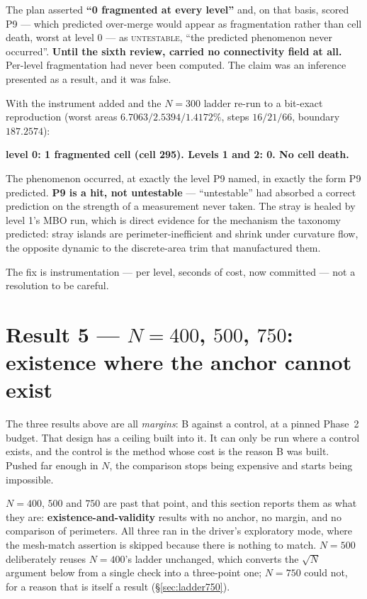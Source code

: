 \documentclass[11pt,a4paper]{article}
\begin{document}
The plan asserted \textbf{``0 fragmented at every level''} and, on that basis,
scored P9 --- which predicted over-merge would appear as fragmentation rather than
cell death, worst at level 0 --- as \textsc{untestable}, ``the predicted phenomenon
never occurred''. \textbf{Until the sixth review,  carried no
connectivity field at all.} Per-level fragmentation had never been computed. The
claim was an inference presented as a result, and it was false.

With the instrument added and the \(N{=}300\) ladder re-run to a bit-exact
reproduction (worst areas \(6.7063/2.5394/1.4172\%\), steps \(16/21/66\), boundary
\(187.2574\)):

\begin{center}\small
\textbf{level 0: 1 fragmented cell (cell 295). Levels 1 and 2: 0. No cell death.}
\end{center}

The phenomenon occurred, at exactly the level P9 named, in exactly the form P9
predicted. \textbf{P9 is a hit, not untestable} --- ``untestable'' had absorbed a
correct prediction on the strength of a measurement never taken. The stray is
healed by level 1's MBO run, which is direct evidence for the mechanism the
taxonomy predicted: stray islands are perimeter-inefficient and shrink under
curvature flow, the opposite dynamic to the discrete-area trim that manufactured
them.

The fix is instrumentation ---  per level, seconds of cost, now
committed --- not a resolution to be careful.

\section{Result 5 --- \(N{=}400\), \(500\), \(750\): existence where the anchor cannot exist}
\label{sec:n400}

The three results above are all \emph{margins}: B against a control, at a pinned
Phase~2 budget. That design has a ceiling built into it. It can only be run where
a control exists, and the control is the method whose cost is the reason B was
built. Pushed far enough in \(N\), the comparison stops being expensive and starts
being impossible.

\(N{=}400\), \(500\) and \(750\) are past that point, and this section reports
them as what they are: \textbf{existence-and-validity} results with no anchor, no
margin, and no comparison of perimeters. All three ran in the driver's exploratory
 mode, where the mesh-match assertion is skipped because there is
nothing to match. \(N{=}500\) deliberately reuses \(N{=}400\)'s ladder unchanged,
which converts the \(\sqrt{N}\) argument below from a single check into a
three-point one; \(N{=}750\) could not, for a reason that is itself a result
(\S\ref{sec:ladder750}).
\end{document}
